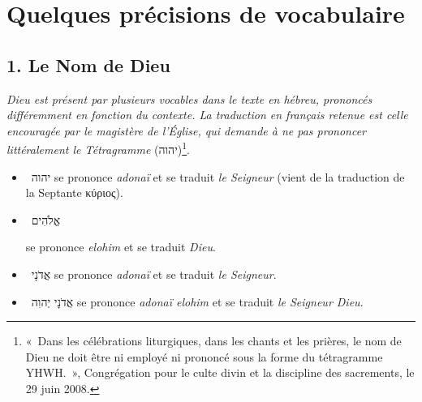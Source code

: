 \section*{Quelques précisions de vocabulaire}

\subsection*{1. Le Nom de Dieu}
\textit{Dieu est présent par plusieurs vocables dans le texte en hébreu, prononcés différemment en fonction du contexte. La traduction en français retenue est celle encouragée par le magistère de l'Église, qui demande à ne pas prononcer littéralement le Tétragramme} (\texthebrew{יהוה})\footnote{«~Dans les célébrations liturgiques, dans les chants et les prières, le nom de Dieu ne doit être ni employé ni prononcé sous la forme du tétragramme YHWH.~», Congrégation pour le culte divin et la discipline des sacrements, le 29 juin 2008.}.\par
\begin{itemize}[label=]
    \item ~\texthebrew{יהוה} se prononce \textit{adonaï} et se traduit \textit{le Seigneur} (vient de la traduction de la Septante \textgreek{κύριος}).
    \item ~\texthebrew{אֱלֹהִים} \raggedright se prononce \textit{elohim} et se traduit \textit{Dieu}.
    \item ~\texthebrew{אֲדֹנָי} se prononce \textit{adonaï} et se traduit \textit{le Seigneur}.
    \item ~\texthebrew{אֲדֹנָי יְהוִה} se prononce \textit{adonaï elohim} et se traduit \textit{le Seigneur Dieu}.
\end{itemize}

